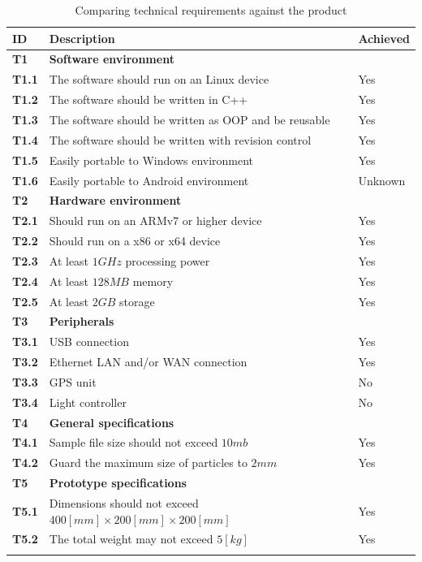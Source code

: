 \documentclass[11pt,fleqn,,a4paper,twoside,openright]{book}
\begin{document}
\begin{longtable}{|p{1cm}| p{10cm} p{1.5cm}|}
	\hline 
	\textbf{ID} & \textbf{Description} & \textbf{Achieved} \\ 
	\endhead
	\hline 
	\textbf{T1}\label{T1} & \textbf{Software environment} &  \\ 
	\hline 
	\textbf{T1.1}\label{T1.1} & The software should run on an Linux device & Yes \\ 
	\hline 
	\textbf{T1.2}\label{T1.2} & The software should be written in C++ & Yes \\ 
	\hline 
	\textbf{T1.3}\label{T1.3} & The software should be written as OOP and be reusable & Yes \\ 
	\hline 
	\textbf{T1.4}\label{T1.4} & The software should be written with revision control & Yes \\
	\hline 
	\textbf{T1.5}\label{T1.5} & Easily portable to Windows environment & Yes \\
	\hline 
	\textbf{T1.6}\label{T1.6} & Easily portable to Android environment & Unknown \\
	\hline 
	\textbf{T2}\label{T2} & \textbf{Hardware environment} &  \\ 
	\hline 
	\textbf{T2.1}\label{T2.1} & Should run on an ARMv7 or higher device &  Yes \\ 
	\hline 
	\textbf{T2.2}\label{T2.2} & Should run on a x86 or x64 device & Yes \\
	\hline 
	\textbf{T2.3}\label{T2.3} & At least $1 GHz$ processing power & Yes \\
	\hline 
	\textbf{T2.4}\label{T2.4} & At least $128 MB$ memory & Yes \\
	\hline 
	\textbf{T2.5}\label{T2.5} & At least $2 GB$ storage & Yes \\
	\hline 
	\textbf{T3}\label{T3} & \textbf{Peripherals}  &  \\ 
	\hline 
	\textbf{T3.1}\label{T3.1} & USB connection  & Yes \\ 
	\hline 
	\textbf{T3.2}\label{T3.2} & Ethernet LAN and/or WAN connection  & Yes \\ 
	\hline 
	\textbf{T3.3}\label{T3.3} & GPS unit & No  \\ 
	\hline 
	\textbf{T3.4}\label{T3.4} & Light controller & No \\
	\hline 
	\textbf{T4}\label{T4} & \textbf{General specifications} &  \\ 
	\hline 
	\textbf{T4.1}\label{T4.1} & Sample file size should not exceed $ 10 mb $ & Yes \\
	\hline 
	\textbf{T4.2}\label{T4.2} & Guard the maximum size of particles to $ 2 mm $ & Yes \\
	\hline 
	\textbf{T5}\label{T5} & \textbf{Prototype specifications} &  \\ 
	\hline 
	\textbf{T5.1}\label{T5.1} & Dimensions should not exceed $ 400[mm] \times 200[mm] \times 200[mm] $ & Yes \\
	\hline 
	\textbf{T5.2}\label{T5.2} & The total weight may not exceed $ 5[kg] $ & Yes \\
	\hline 
	\caption{Comparing technical requirements against the product}\label{tab:TechReqComp}	
\end{longtable} 
\end{document}

